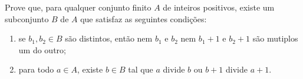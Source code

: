 Prove que, para qualquer conjunto finito $A$ de inteiros positivos, existe um subconjunto $B$ de $A$ que satisfaz as seguintes condições:
\begin{enumerate}[label = (\roman*), noitemsep]
	\item se $b_1, b_2\in B$ são distintos, então nem $b_1$ e $b_2$ nem $b_1+1$ e $b_2+1$ são mutiplos um do outro;
	\item para todo $a\in A$, existe $b\in B$ tal que $a$ divide $b$ ou $b+1$ divide $a+1$.
\end{enumerate}

